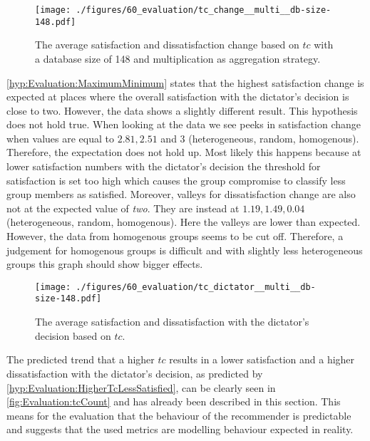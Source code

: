 \begin{figure}
    \centering
    \texttt{[image: ./figures/60\_evaluation/tc\_change\_\_multi\_\_db-size-148.pdf]}
    \caption{The average satisfaction and dissatisfaction change based on $tc$ with a database size of 148 and multiplication as aggregation strategy.}
    \label{fig:Evaluation:tcChange}
\end{figure}

\autoref{hyp:Evaluation:MaximumMinimum} states that the highest satisfaction change is expected at places where the overall satisfaction with the dictator's decision is close to two. However, the data shows a slightly different result. This hypothesis does not hold true. When looking at the data we see peeks in satisfaction change when values are equal to $2.81, 2.51$ and $3$ (heterogeneous, random, homogenous). Therefore, the expectation does not hold up. Most likely this happens because at lower satisfaction numbers with the dictator's decision the threshold for satisfaction is set too high which causes the group compromise to classify less group members as satisfied. Moreover, valleys for dissatisfaction change are also not at the expected value of \textit{two}. They are instead at $1.19, 1.49, 0.04$ (heterogeneous, random, homogenous). Here the valleys are lower than expected. However, the data from homogenous groups seems to be cut off. Therefore, a judgement for homogenous groups is difficult and with slightly less heterogeneous groups this graph should show bigger effects.

\begin{figure}
    \centering
    \texttt{[image: ./figures/60\_evaluation/tc\_dictator\_\_multi\_\_db-size-148.pdf]}
    \caption{The average satisfaction and dissatisfaction with the dictator's decision based on $tc$.}
    \label{fig:Evaluation:tcCount}
\end{figure}

The predicted trend that a higher $tc$ results in a lower satisfaction and a higher dissatisfaction with the dictator's decision, as predicted by \autoref{hyp:Evaluation:HigherTcLessSatisfied}, can be clearly seen in \autoref{fig:Evaluation:tcCount} and has already been described in this section. This means for the evaluation that the behaviour of the recommender is predictable and suggests that the used metrics are modelling behaviour expected in reality.


